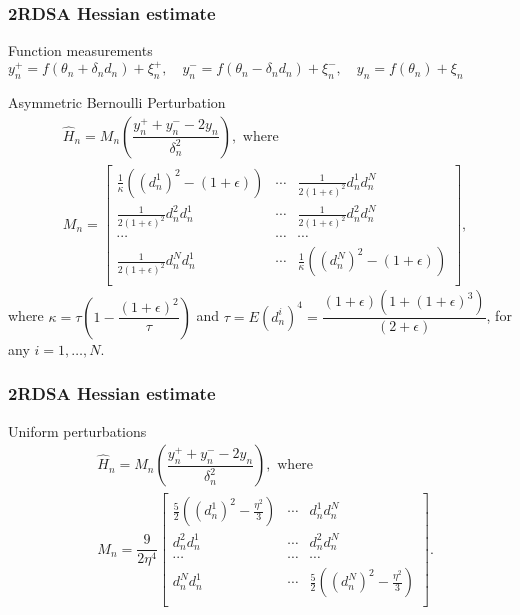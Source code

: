 \begin{frame}
\begin{small}
\frametitle{\centering  2RDSA Hessian estimate}
\begin{block}{Function measurements}
$y_{n}^+ = f(\theta_n+\delta_n d_n) + \xi_{n}^+,\quad y_{n}^- = f(\theta_n-\delta_n d_n) + \xi_{n}^-,\quad y_{n} = f(\theta_n) + \xi_{n}$
\end{block}
\begin{block}{Asymmetric Bernoulli Perturbation}
\begin{align}
\label{eq:2rdsa-estimate-ber}
&\widehat H_n = M_n \left(\dfrac{y_n^+ + y_n^- - 2 y_n}{\delta_n^2}\right), \text{ where }\\
& M_n =
\left[
\begin{array}{ccc}
\frac{1}{\kappa}\left((d_n^1)^2\!-(1+\epsilon)\right) & \cdots & \frac{1}{2(1+\epsilon)^2}d_n^1 d_n^N\\
\frac{1}{2(1+\epsilon)^2}d_n^2 d_n^1  &  \cdots & \frac{1}{2(1+\epsilon)^2}d_n^2 d_n^N\\
\cdots&\cdots&\cdots\\
\frac{1}{2(1+\epsilon)^2}d_n^N d_n^1 & \cdots &  \frac{1}{\kappa}\left((d_n^N)^2-(1+\epsilon)\right) \\
\end{array}
\right],\nonumber
\end{align}
where $\kappa = \tau \left(1- \dfrac{(1+\epsilon)^2}{\tau}\right)$ and $\tau = E (d_n^i)^4= \dfrac{(1+\epsilon)(1+(1+\epsilon)^3)}{(2+\epsilon)}$, for any $i=1,\ldots,N$. 
\end{block}
\end{small}
\end{frame}

\begin{frame}
\begin{small}
\frametitle{\centering  2RDSA Hessian estimate}
\begin{block}{Uniform perturbations}
\begin{align}
\label{eq:2rdsa-estimate-unif}
&\widehat H_n =  M_n \left(\dfrac{y_n^+ + y_n^- - 2 y_n}{\delta_n^2}\right), \text{ where } \\
& M_n =
\dfrac{9}{2\eta^4}\left[
\begin{array}{cccc}
\frac{5}{2}\left((d_n^1)^2-\frac{\eta^2}{3}\right) & \cdots & d_n^1 d_n^N\\
d_n^2 d_n^1  &  \cdots & d_n^2 d_n^N\\
\cdots&\cdots&\cdots\\
d_n^N d_n^1 & \cdots &  \frac{5}{2}\left((d_n^N)^2-\frac{\eta^2}{3}\right) \\
\end{array}
\right].\nonumber
\end{align}
\end{block}
\end{small}
\end{frame}




